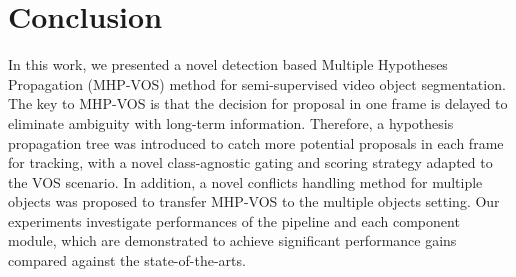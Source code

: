 \documentclass[10pt,twocolumn,letterpaper]{article}
\begin{document}
\vspace{-6pt}
\section{Conclusion} 
\vspace{-6pt}
In this work, we presented a novel detection based Multiple Hypotheses Propagation (MHP-VOS) method for semi-supervised video object segmentation. The key to MHP-VOS is that the decision for proposal in one frame is delayed to eliminate ambiguity with long-term information. Therefore, a hypothesis propagation tree was introduced to catch more potential proposals in each frame for tracking, with a novel class-agnostic gating and scoring strategy adapted to the VOS scenario. In addition, a novel conflicts handling method for multiple objects was proposed to transfer MHP-VOS to the multiple objects setting. Our experiments investigate performances of the pipeline and each component module, which are demonstrated to achieve significant performance gains compared against the state-of-the-arts.


{\small


}
\end{document}
